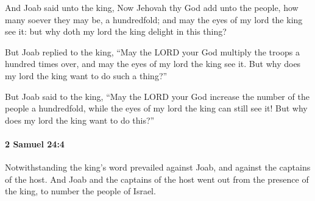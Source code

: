 			\begin{versebox}
					\item[BHS] 
					\item[ASV] And Joab said unto the king, Now Jehovah thy God add unto the people, how many soever they may be, a hundredfold; and may the eyes of my lord the king see it: but why doth my lord the king delight in this thing?
					\item[NIV] But Joab replied to the king, “May the LORD your God multiply the troops a hundred times over, and may the eyes of my lord the king see it. But why does my lord the king want to do such a thing?”
					\item[NRSV] But Joab said to the king, “May the LORD your God increase the number of the people a hundredfold, while the eyes of my lord the king can still see it! But why does my lord the king want to do this?”
			\end{versebox}

		\paragraph{2 Samuel 24:4} %
			\label{2SAMUEL-24-4}

			Notwithstanding the king’s word prevailed against Joab, and against the captains of the host. And Joab and the captains of the host went out from the presence of the king, to number the people of Israel.

